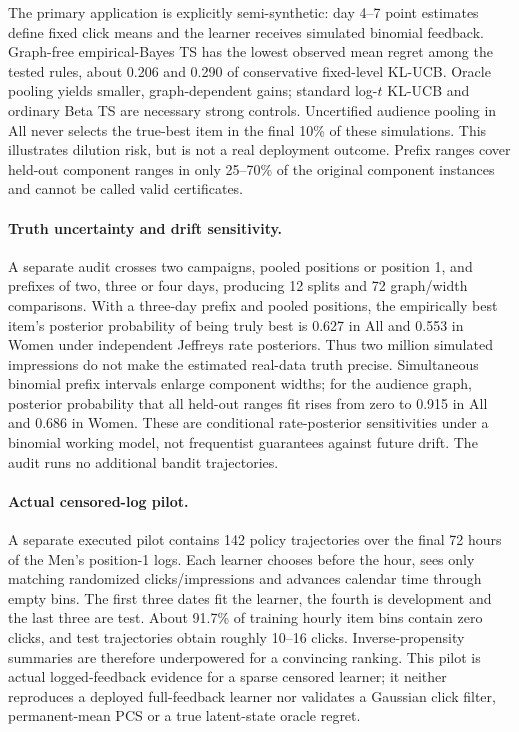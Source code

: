 

The primary application is explicitly semi-synthetic: day 4--7 point estimates define fixed click means and the learner receives simulated binomial feedback. Graph-free empirical-Bayes TS has the lowest observed mean regret among the tested rules, about 0.206 and 0.290 of conservative fixed-level KL-UCB. Oracle pooling yields smaller, graph-dependent gains; standard log-$t$ KL-UCB and ordinary Beta TS are necessary strong controls. Uncertified audience pooling in All never selects the true-best item in the final 10\% of these simulations. This illustrates dilution risk, but is not a real deployment outcome. Prefix ranges cover held-out component ranges in only 25--70\% of the original component instances and cannot be called valid certificates.

\paragraph{Truth uncertainty and drift sensitivity.} A separate audit crosses two campaigns, pooled positions or position 1, and prefixes of two, three or four days, producing 12 splits and 72 graph/width comparisons. With a three-day prefix and pooled positions, the empirically best item's posterior probability of being truly best is 0.627 in All and 0.553 in Women under independent Jeffreys rate posteriors. Thus two million simulated impressions do not make the estimated real-data truth precise. Simultaneous binomial prefix intervals enlarge component widths; for the audience graph, posterior probability that all held-out ranges fit rises from zero to 0.915 in All and 0.686 in Women. These are conditional rate-posterior sensitivities under a binomial working model, not frequentist guarantees against future drift. The audit runs no additional bandit trajectories.

\paragraph{Actual censored-log pilot.} A separate executed pilot contains 142 policy trajectories over the final 72 hours of the Men's position-1 logs. Each learner chooses before the hour, sees only matching randomized clicks/impressions and advances calendar time through empty bins. The first three dates fit the learner, the fourth is development and the last three are test. About 91.7\% of training hourly item bins contain zero clicks, and test trajectories obtain roughly 10--16 clicks. Inverse-propensity summaries are therefore underpowered for a convincing ranking. This pilot is actual logged-feedback evidence for a sparse censored learner; it neither reproduces a deployed full-feedback learner nor validates a Gaussian click filter, permanent-mean PCS or a true latent-state oracle regret.

